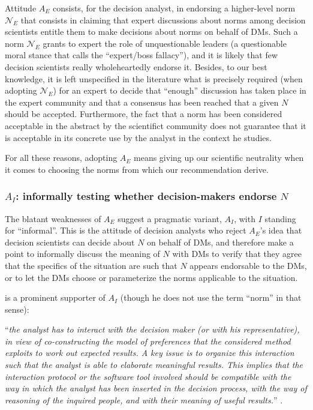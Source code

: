 \documentclass[preprint, french, english, 11pt, authoryear]{elsarticle}%
\newcommand{\protectforpdf}[1]{\texorpdfstring{\ensuremath{#1}}{#1}}
\begin{document}
Attitude $A_E$ consists, for the decision analyst, in endorsing a higher-level norm $\mathscr{N}_E$ that consists in claiming that expert discussions about norms among decision scientists entitle them to make decisions about norms on behalf of \acp{DM}. Such a norm $\mathscr{N}_E$ grants to expert the role of unquestionable leaders (a questionable moral stance that \citet{estlund_democratic_2009} calls the ``expert/boss fallacy''), and it is likely that few decision scientists really wholeheartedly endorse it. Besides, to our best knowledge, it is left unspecified in the literature what is precisely required (when adopting  $\mathscr{N}_E$) for an expert to decide that “enough” discussion has taken place in the expert community and that a consensus has been reached that a given $N$ should be accepted. Furthermore, the fact that a norm has been considered acceptable in the abstract by the scientifict community does not guarantee that it is acceptable in its concrete use by the analyst in the context he studies.

For all these reasons, adopting $A_E$ means giving up our scientific neutrality when it comes to choosing the norms from which our recommendation derive. 

\subsubsection{\texorpdfstring{$A_I$}{AI}: informally testing whether decision-makers endorse \protectforpdf{N}}
The blatant weaknesses of $A_E$ suggest a pragmatic variant, $A_I$, with $I$ standing for “informal”. This is the attitude of decision analysts who reject $A_E$'s idea that decision scientists can decide about $N$ on behalf of \acp{DM}, and therefore make a point to informally discuss the meaning of $N$ with \acp{DM} to verify that they agree that the specifics of the situation are such that $N$ appears endorsable to the \acp{DM}, or to let the \acp{DM} choose or parameterize the norms applicable to the situation.

\citet{roy_multicriteria_1996} is a prominent supporter of $A_I$ (though he does not use the term “norm” in that sense): 
\begin{addmargin}[3em]{3em}
 “\emph{the analyst has to interact
with the decision maker (or with his representative), in view of co-constructing the model of preferences that the considered method exploits to work out expected results. A key issue is to organize this interaction such that the analyst is able to
elaborate meaningful results. This implies that the interaction protocol or the
software tool involved should be compatible with the way in which the analyst has
been inserted in the decision process, with the way of reasoning of the inquired
people, and with their meaning of useful results.}” \citep[pp. 84--85]{roy_questions_2013}.
\end{addmargin}
\end{document}
